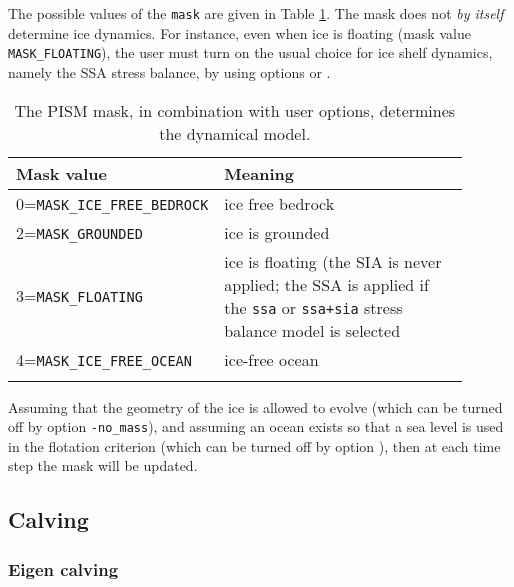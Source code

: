 The possible values of the \texttt{mask} are given in Table \ref{tab:maskvals}.  The mask does not \emph{by itself} determine ice dynamics.  For instance, even when ice is floating (mask value \texttt{MASK_FLOATING}), the user must turn on the usual choice for ice shelf dynamics, namely the SSA stress balance, by using options  or .

\begin{table}[ht]
  \centering
 \small
  \begin{tabular}{p{0.25\linewidth}p{0.65\linewidth}}
    \toprule
    \textbf{Mask value} & \textbf{Meaning}\\
    \midrule
    0=\texttt{MASK_ICE_FREE_BEDROCK} & ice free bedrock \\
    2=\texttt{MASK_GROUNDED}& ice is grounded \\
    3=\texttt{MASK_FLOATING} & ice is floating (the SIA is never applied; the SSA is applied if the \texttt{ssa} or \texttt{ssa+sia} stress balance model is selected\\
    4=\texttt{MASK_ICE_FREE_OCEAN} & ice-free ocean \\
    \\\bottomrule
  \end{tabular}
  \normalsize
  \caption{The PISM mask, in combination with user options, determines the dynamical model.}
  \label{tab:maskvals} 
\end{table}

Assuming that the geometry of the ice is allowed to evolve (which can be turned off by option \texttt{-no_mass}), and assuming an ocean exists so that a sea level is used in the flotation criterion (which can be turned off by option ), then at each time step the mask will be updated.

\subsection{Calving}
\label{sec:calving}


\subsubsection{Eigen calving}
\label{subsec:eigen-calving}

